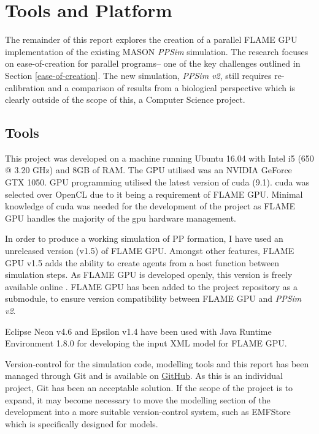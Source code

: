 \documentclass{UoYCSproject}
\begin{document}
\chapter{Tools and Platform}
\label{tools}

The remainder of this report explores the creation of a parallel \gls{FLAME GPU} implementation of the existing MASON \textit{PPSim} simulation.
The research focuses on ease-of-creation for parallel programs-- one of the key challenges outlined in Section \ref{ease-of-creation}.
The new simulation, \textit{PPSim v2}, still requires re-calibration and a comparison of results from a biological perspective which is clearly outside of the scope of this, a Computer Science project.

\section{Tools}
This project was developed on a machine running Ubuntu 16.04 with Intel i5 (650 @ 3.20 GHz) and 8GB of RAM.
The GPU utilised was an NVIDIA GeForce GTX 1050.
GPU programming utilised the latest version of \gls{cuda} (9.1).
\gls{cuda} was selected over OpenCL due to it being a requirement of \gls{FLAME GPU}.
Minimal knowledge of \gls{cuda} was needed for the development of the project as \gls{FLAME GPU} handles the majority of the \gls{gpu} hardware management.

In order to produce a working simulation of \gls{PP} formation, I have used an unreleased version (v1.5) of \gls{FLAME GPU}.
Amongst other features, \gls{FLAME GPU} v1.5 adds the ability to create agents from a host function between simulation steps.
As \gls{FLAME GPU} is developed openly, this version is freely available online \cite{flame_github}.
\gls{FLAME GPU} has been added to the project repository as a submodule, to ensure version compatibility between \gls{FLAME GPU} and \textit{PPSim v2}.

Eclipse Neon v4.6 and Epsilon v1.4 have been used with Java Runtime Environment 1.8.0 for developing the input XML model for \gls{FLAME GPU}.

Version-control for the simulation code, modelling tools and this report has been managed through Git and is available on \href{https://github.com/oliver-binns/PRIY.git}{GitHub}.
As this is an individual project, Git has been an acceptable solution.
If the scope of the project is to expand, it may become necessary to move the modelling section of the development into a more suitable version-control system, such as EMFStore\cite{emf_store} which is specifically designed for models.
\end{document}
